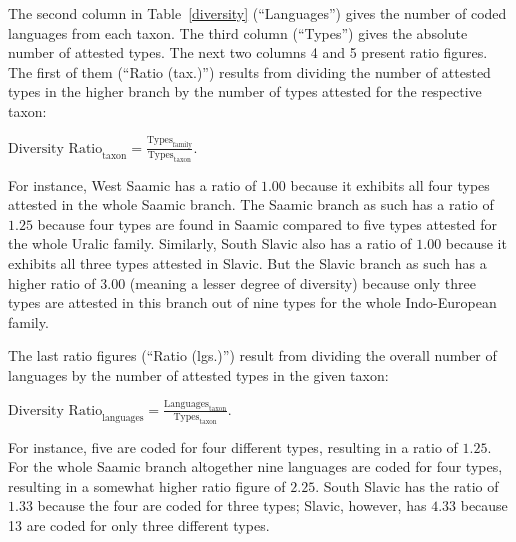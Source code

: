 The second column in Table~\ref{diversity} (“Languages”) gives the number of coded languages from each taxon. The third column (“Types”) gives the absolute number of attested types. The next two columns 4 and 5 present ratio figures. The first of them (“Ratio (tax.)”) results from dividing the number of attested types in the higher branch by the number of types attested for the respective taxon:\medskip

$\text{Diversity Ratio}_{\text{taxon}} = \frac{\text{Types}_{\text{family}}}{\text{Types}_{\text{taxon}}}$.\medskip

\noindent For instance, West Saamic has a ratio of $1.00$ because it exhibits all four types attested in the whole Saamic branch. The Saamic branch as such has a ratio of $1.25$ because four types are found in Saamic compared to five types attested for the whole Uralic family. Similarly, South Slavic also has a ratio of $1.00$ because it exhibits all three types attested in Slavic. But the Slavic branch as such has a higher ratio of $3.00$ (meaning a lesser degree of diversity) because only three types are attested in this branch out of nine types for the whole Indo-European family. 

\newpage
The last ratio figures (“Ratio (lgs.)”) result from dividing the overall number of languages by the number of attested types in the given taxon:\medskip

$\text{Diversity Ratio}_{\text{languages}} = \frac{\text{Languages}_{\text{taxon}}}{\text{Types}_{\text{taxon}}}$.\medskip

\noindent For instance, five  are coded for four different types, resulting in a ratio of $1.25$. For the whole Saamic branch altogether nine languages are coded for four types, resulting in a somewhat higher ratio figure of $2.25$. South Slavic has the ratio of $1.33$ because the four  are coded for three types; Slavic, however, has $4.33$ because 13  are coded for only three different types.

